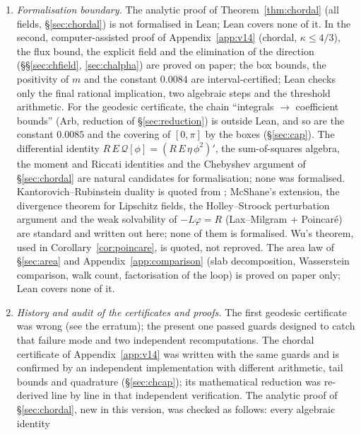 \documentclass[11pt,a4paper]{article}
\theoremstyle{remark}
\theoremstyle{definition}
\theoremstyle{plain}
\theoremstyle{remark}
\newcommand{\st}[1]{\textsf{[#1]}}
\begin{document}
\begin{enumerate}
discussion of Gross'', the truncated spin--spin correlations decay exponentially under the $W_1$ condition with a
semi-metric weight (his (3.46)--(3.47)); applied to our influence matrices this would plausibly give exponential
decay of correlations of Lipschitz observables for $\beta<2/9$ \st{conjecture}. Nothing is claimed.
\item \emph{Formalisation boundary.} The analytic proof of Theorem~\ref{thm:chordal} (all fields, \S\ref{sec:chordal}) is not formalised in Lean; Lean covers none of it.
In the second, computer-assisted proof of Appendix~\ref{app:v14} (chordal, $\kappa\le4/3$), the flux bound, the explicit field and the elimination of the direction
(\S\S\ref{sec:chfield}, \ref{sec:chalpha}) are proved on paper; the box bounds, the positivity of $m$ and the constant $0.0084$ are interval-certified; Lean checks only the final rational
implication, two algebraic steps and the threshold arithmetic. For the geodesic certificate, the chain
``integrals $\to$ coefficient bounds'' (Arb, reduction of \S\ref{sec:reduction}) is outside Lean, and so are the
constant $0.0085$ and the covering of $[0,\pi]$ by the boxes (\S\ref{sec:cap}). The differential identity $R\,E\,\mathcal Q[\phi]=(R\,E\,\eta\,\phi^2)'$, the sum-of-squares algebra,
the moment and Riccati identities and the Chebyshev argument of \S\ref{sec:chordal} are natural candidates for formalisation; none was formalised. Kantorovich--Rubinstein duality is
quoted from \cite[Thm~10.8, p.~53]{DS25}; McShane's extension, the divergence theorem for Lipschitz fields, the
Holley--Stroock perturbation argument \cite{HS87} and the weak solvability of $-L\varphi=R$ (Lax--Milgram +
Poincar\'e) are standard and written out here; none of them is formalised. Wu's theorem, used in Corollary~\ref{cor:poincare}, is quoted, not reproved. The area law of \S\ref{sec:area} and Appendix~\ref{app:comparison}
(slab decomposition, Wasserstein comparison, walk count, factorisation of the loop) is proved on paper only; Lean covers none of it.
\item \emph{History and audit of the certificates and proofs.} The first geodesic certificate was wrong (see the erratum);
the present one passed guards designed to catch that failure mode and two independent recomputations. The chordal
certificate of Appendix~\ref{app:v14} was written with the same guards and is confirmed by an independent implementation with different
arithmetic, tail bounds and quadrature (\S\ref{sec:chcap}); its mathematical reduction was re-derived line by line
in that independent verification. The analytic proof of \S\ref{sec:chordal}, new in this version, was checked as follows: every algebraic identity

\end{enumerate}
\end{document}
